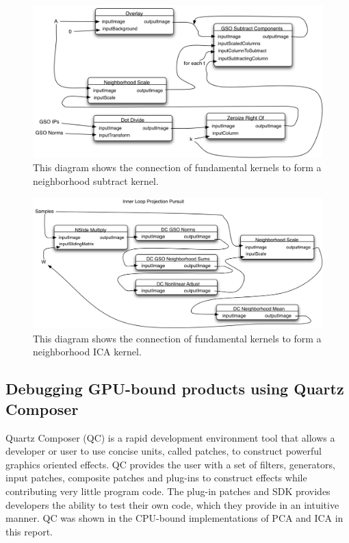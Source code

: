 \documentclass[11pt]{article}
\begin{document}
\begin{figure}[htbp] %
   \centering
   \includegraphics[width=5in]{gso-subtract.jpg} 
   \caption{This diagram shows the connection of fundamental kernels to form a neighborhood subtract kernel. }
   \label{gsoSubtract}
\end{figure}


\begin{figure}[htbp] %
   \centering
   \includegraphics[width=5in]{neighborhoodICA.jpg} 
   \caption{This diagram shows the connection of fundamental kernels to form a neighborhood ICA kernel. }
   \label{neighborhoodICA}
\end{figure}

\subsection{Debugging GPU-bound products using Quartz Composer}
Quartz Composer (QC) is a rapid development environment tool that allows a developer or user to use concise units, called patches, to construct powerful graphics oriented effects.  QC provides the user with a set of filters, generators, input patches, composite patches and plug-ins to construct effects while contributing very little program code.  The plug-in patches and SDK provides developers the ability to test their own code, which they provide in an intuitive manner.  QC was shown in the CPU-bound implementations of PCA and ICA in this report.  
\end{document}
